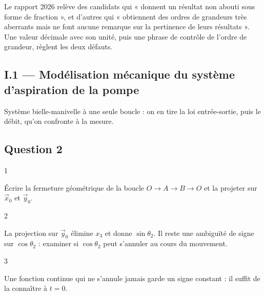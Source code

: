 \documentclass[11pt,a4paper]{article}
\begin{document}
\begin{jury}

Le rapport 2026 relève des candidats qui « donnent un résultat non abouti sous forme de fraction », et d'autres qui « obtiennent des ordres de grandeurs très aberrants mais ne font aucune remarque sur la pertinence de leurs résultats ». Une valeur décimale avec son unité, puis une phrase de contrôle de l'ordre de grandeur, règlent les deux défauts.

\end{jury}

\hypertarget{i.1-moduxe9lisation-muxe9canique-du-systuxe8me-daspiration-de-la-pompe}{%
\subsection{I.1 --- Modélisation mécanique du système d'aspiration de la pompe}\label{i.1-moduxe9lisation-muxe9canique-du-systuxe8me-daspiration-de-la-pompe}}

Système bielle-manivelle à une seule boucle : on en tire la loi entrée-sortie, puis le débit, qu'on confronte à la mesure.

\hypertarget{question-2}{%
\subsection{Question 2}\label{question-2}}

\begin{indication}{1}

Écrire la fermeture géométrique de la boucle \(O\to A\to B\to O\) et la projeter sur \(\vec x_0\) et \(\vec y_0\).

\end{indication}

\begin{indication}{2}

La projection sur \(\vec y_0\) élimine \(x_3\) et donne \(\sin\theta_2\). Il reste une ambiguïté de signe sur \(\cos\theta_2\) : examiner si \(\cos\theta_2\) peut s'annuler au cours du mouvement.

\end{indication}

\begin{indication}{3}

Une fonction continue qui ne s'annule jamais garde un signe constant : il suffit de la connaître à \(t=0\).

\end{indication}
\end{document}
